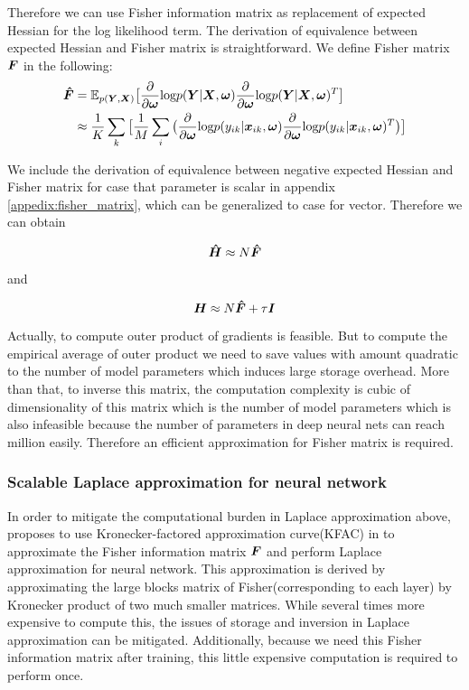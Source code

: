 Therefore we can use Fisher information matrix as replacement of expected Hessian for the log likelihood term. The derivation of equivalence between expected Hessian and Fisher matrix is straightforward. We define Fisher matrix $\boldsymbol F$ in the following:
\begin{equation}
\begin{aligned}\label{Fisher}
\boldsymbol{\hat{F}} &= \mathbb E_{p(\boldsymbol Y, \boldsymbol X)}\big[\frac{\partial}{\partial \boldsymbol \omega}\text{log}p(\boldsymbol Y|\boldsymbol X,\boldsymbol \omega)\frac{\partial}{\partial \boldsymbol \omega}\text{log}p(\boldsymbol Y|\boldsymbol X,\boldsymbol \omega)^T\big] \\
&\approx \frac{1}{K}\sum_{k}\big[\frac{1}{M}\sum_{i}
\big(\frac{\partial}{\partial \boldsymbol \omega}\text{log}p(y_{ik}|\boldsymbol x_{ik},\boldsymbol \omega)\frac{\partial}{\partial \boldsymbol \omega}\text{log}p(y_{ik}|\boldsymbol x_{ik},\boldsymbol \omega)^T\big)\big]
\end{aligned}
\end{equation}

We include the derivation of equivalence between negative expected Hessian and Fisher matrix for case that parameter is scalar in appendix \ref{appedix:fisher_matrix}, which can be generalized to case for vector.
Therefore we can obtain 

\begin{equation} \label{fisher hessian}
\boldsymbol{\hat{H}} \approx N\boldsymbol{\hat{F}}
\end{equation}

and

\begin{equation} \label{fisher hessian_with_prior}
\boldsymbol H \approx N\boldsymbol{\hat F} + \tau \mathcal {\boldsymbol I}
\end{equation}

Actually, to compute outer product of gradients is feasible. But to compute the empirical average of outer product we need to save values with amount quadratic to the number of model parameters which induces large storage overhead. More than that, to inverse this matrix, the computation complexity is cubic of dimensionality of this matrix which is the number of model parameters which is also infeasible because the number of parameters in deep neural nets can reach million easily. Therefore an efficient approximation for Fisher matrix is required. 


\subsubsection{Scalable Laplace approximation for neural network}
In order to mitigate the computational burden in Laplace approximation above, \cite{ritter2018scalable} proposes to use Kronecker-factored approximation curve(KFAC) in \cite{martens2015optimizing} to approximate the Fisher information matrix $\boldsymbol F$ and perform Laplace approximation for neural network. This approximation is derived by approximating the large blocks matrix of Fisher(corresponding to each layer) by Kronecker product of two much smaller matrices. While several times more expensive to compute this, the issues of storage and inversion in Laplace approximation can be mitigated. Additionally, because we need this Fisher information matrix after training, this little expensive computation is required to perform once.

